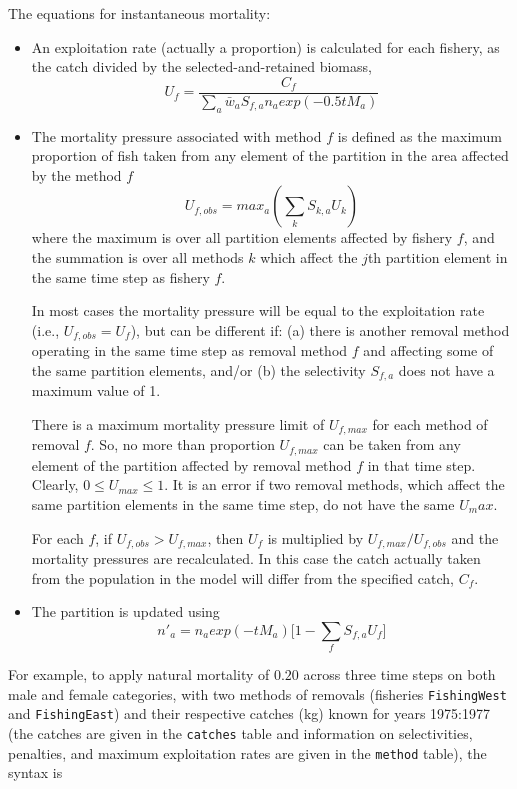 The equations for instantaneous mortality:


\begin{itemize}
	\item An exploitation rate (actually a proportion) is calculated for each fishery, as the catch divided by the selected-and-retained biomass,
	$$ U_f = \frac{C_f}{\sum_a \bar{w}_a S_{f,a} n_a exp(-0.5 t M_a)}$$
	\item The mortality pressure associated with method $f$ is defined as the maximum proportion of fish taken from any element of the partition in the area affected by the method $f$
	$$ U_{f,obs} = max_a(\sum_k S_{k,a} U_k) $$
	where the maximum is over all partition elements affected by fishery $f$, and the summation is over all methods $k$ which affect the $j$th partition element in the same time step as fishery $f$.

	In most cases the mortality pressure will be equal to the exploitation rate (i.e., $U_{f,obs} = U_f$), but can be different if: (a) there is another removal method operating in the same time step as removal method $f$ and affecting some of the same partition elements, and/or (b) the selectivity $S_{f,a}$ does not have a maximum value of 1.

	There is a maximum mortality pressure limit of $U_{f,max}$ for each method of removal $f$. So, no more than proportion $U_{f,max}$ can be taken from any element of the partition affected by removal method $f$ in that time step. Clearly, $0 \leq U_{max} \leq 1$. It is an error if two removal methods, which affect the same partition elements in the same time step, do not have the same $U_max$.

	For each $f$, if $U_{f,obs} > U_{f,max}$, then $U_f$ is multiplied by $U_{f,max}/U_{f,obs}$ and the mortality pressures are recalculated. In this case the catch actually taken from the population in the model will differ from the specified catch, $C_f$.

	\item The partition is updated using
		$$ n'_a = n_a exp(-tM_a)\big[1 - \sum_f S_{f,a} U_f \big] $$
\end{itemize}

For example, to apply natural mortality of $0.20$ across three time steps on both male and female categories, with two methods of removals (fisheries \texttt{FishingWest} and \texttt{FishingEast}) and their respective catches (kg) known for years 1975:1977 (the catches are given in the \texttt{catches} table and information on selectivities, penalties, and maximum exploitation rates are given in the \texttt{method} table), the syntax is

